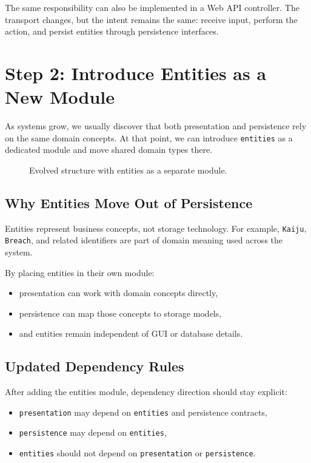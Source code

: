 The same responsibility can also be implemented in a Web API controller. The transport changes, but the intent remains the same: receive input, perform the action, and persist entities through persistence interfaces.

\section{Step 2: Introduce Entities as a New Module}
\label{sec:2_layered_step2_entities}

As systems grow, we usually discover that both presentation and persistence rely on the same domain concepts. At that point, we can introduce \texttt{entities} as a dedicated module and move shared domain types there.

\begin{figure}[htbp]
    \centering
    
    \caption{Evolved structure with entities as a separate module.}
    \label{fig:2_layered_with_entities}
\end{figure}

\subsection{Why Entities Move Out of Persistence}
\label{sec:2_layered_why_entities_module}

Entities represent business concepts, not storage technology. For example, \texttt{Kaiju}, \texttt{Breach}, and related identifiers are part of domain meaning used across the system.

By placing entities in their own module:
\begin{itemize}
    \item presentation can work with domain concepts directly,
    \item persistence can map those concepts to storage models,
    \item and entities remain independent of GUI or database details.
\end{itemize}

\subsection{Updated Dependency Rules}
\label{sec:2_layered_dependency_rules}

After adding the entities module, dependency direction should stay explicit:
\begin{itemize}
    \item \texttt{presentation} may depend on \texttt{entities} and persistence contracts,
    \item \texttt{persistence} may depend on \texttt{entities},
    \item \texttt{entities} should not depend on \texttt{presentation} or \texttt{persistence}.
\end{itemize}

